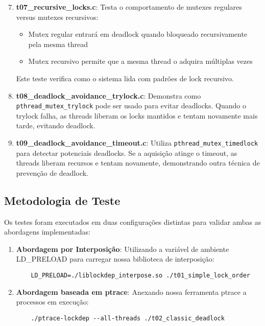 \begin{enumerate}\setcounter{enumi}{6}
    \item \textbf{t07\_recursive\_locks.c}: Testa o comportamento de mutexes regulares versus mutexes recursivos:
    \begin{itemize}
        \item Mutex regular entrará em deadlock quando bloqueado recursivamente pela mesma thread
        \item Mutex recursivo permite que a mesma thread o adquira múltiplas vezes
    \end{itemize}
    Este teste verifica como o sistema lida com padrões de lock recursivo.

    \item \textbf{t08\_deadlock\_avoidance\_trylock.c}: Demonstra como \texttt{pthread\_mutex\_trylock} pode ser usado para evitar deadlocks. Quando o trylock falha, as threads liberam os locks mantidos e tentam novamente mais tarde, evitando deadlock.

    \item \textbf{t09\_deadlock\_avoidance\_timeout.c}: Utiliza \texttt{pthread\_mutex\_timedlock} para detectar potenciais deadlocks. Se a aquisição atinge o timeout, as threads liberam recursos e tentam novamente, demonstrando outra técnica de prevenção de deadlock.
\end{enumerate}

\subsection{Metodologia de Teste}

Os testes foram executados em duas configurações distintas para validar ambas as abordagens implementadas:

\begin{enumerate}
    \item \textbf{Abordagem por Interposição}: Utilizando a variável de ambiente LD\_PRELOAD para carregar nossa biblioteca de interposição:
    \begin{verbatim}
    LD_PRELOAD=./liblockdep_interpose.so ./t01_simple_lock_order
    \end{verbatim}

    \item \textbf{Abordagem baseada em ptrace}: Anexando nossa ferramenta ptrace a processos em execução:
    \begin{verbatim}
    ./ptrace-lockdep --all-threads ./t02_classic_deadlock
    \end{verbatim}
\end{enumerate}

